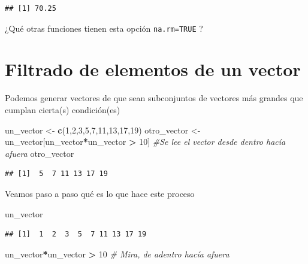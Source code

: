 \documentclass[
]{book}
\newenvironment{Shaded}{\begin{snugshade}}{\end{snugshade}}
\newcommand{\CommentTok}[1]{\textcolor[rgb]{0.56,0.35,0.01}{\textit{#1}}}
\newcommand{\DecValTok}[1]{\textcolor[rgb]{0.00,0.00,0.81}{#1}}
\newcommand{\FunctionTok}[1]{\textcolor[rgb]{0.13,0.29,0.53}{\textbf{#1}}}
\newcommand{\NormalTok}[1]{#1}
\newcommand{\OtherTok}[1]{\textcolor[rgb]{0.56,0.35,0.01}{#1}}
\newcommand{\SpecialCharTok}[1]{\textcolor[rgb]{0.81,0.36,0.00}{\textbf{#1}}}
\begin{document}
\begin{verbatim}
## [1] 70.25
\end{verbatim}

¿Qué otras funciones tienen esta opción \texttt{na.rm=TRUE} ?

\hypertarget{filtrado-de-elementos-de-un-vector}{%
\section{Filtrado de elementos de un vector}\label{filtrado-de-elementos-de-un-vector}}

Podemos generar vectores de que sean subconjuntos de vectores más grandes que cumplan cierta(s) condición(es)

\begin{Shaded}
\begin{Highlighting}[]
\NormalTok{un\_vector }\OtherTok{\textless{}{-}} \FunctionTok{c}\NormalTok{(}\DecValTok{1}\NormalTok{,}\DecValTok{2}\NormalTok{,}\DecValTok{3}\NormalTok{,}\DecValTok{5}\NormalTok{,}\DecValTok{7}\NormalTok{,}\DecValTok{11}\NormalTok{,}\DecValTok{13}\NormalTok{,}\DecValTok{17}\NormalTok{,}\DecValTok{19}\NormalTok{) }
\NormalTok{otro\_vector }\OtherTok{\textless{}{-}}\NormalTok{ un\_vector[un\_vector}\SpecialCharTok{*}\NormalTok{un\_vector }\SpecialCharTok{\textgreater{}} \DecValTok{10}\NormalTok{]   }\CommentTok{\#Se lee el vector desde dentro hacía afuera}
\NormalTok{otro\_vector}
\end{Highlighting}
\end{Shaded}

\begin{verbatim}
## [1]  5  7 11 13 17 19
\end{verbatim}

Veamos paso a paso qué es lo que hace este proceso

\begin{Shaded}
\begin{Highlighting}[]
\NormalTok{un\_vector}
\end{Highlighting}
\end{Shaded}

\begin{verbatim}
## [1]  1  2  3  5  7 11 13 17 19
\end{verbatim}

\begin{Shaded}
\begin{Highlighting}[]
\NormalTok{un\_vector}\SpecialCharTok{*}\NormalTok{un\_vector }\SpecialCharTok{\textgreater{}} \DecValTok{10}    \CommentTok{\# Mira, de adentro hacía afuera}
\end{Highlighting}
\end{Shaded}
\end{document}
